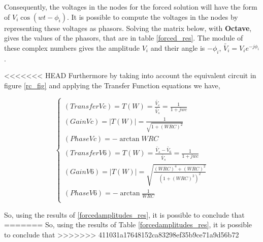 
Consequently, the voltages in the nodes for the forced solution will have the form of $V_i\cos(wt-\phi_i)$. It is possible to compute the voltages in the nodes by representing these voltages as phasors. Solving the matrix below, with {\bf Octave}, gives the values of the phasors, that are in table \ref{forced_res}. The module of these complex numbers gives the amplitude $V_i$ and their angle is $-\phi_i$, $\widetilde{V_i} = V_ie^{-j\phi_i}$.

<<<<<<< HEAD
Furthermore by taking into account the equivalent circuit in figure \ref{rc_fig} and applying the Transfer Function equations we have,

\begin{equation}
  \begin{cases}
    (Transfer Vc) = T(W) = \frac{\widetilde{V_c}}{\widetilde{{V_s}}} = \frac{1}{1 + jwc} \\
    (Gain Vc) = |T(W)| =  \frac{1}{\sqrt{1 + (WRC)^{2}}} \\
    (Phase Vc) = -\arctan{ WRC } \\
    (Transfer V6) =  T(W) = \frac{\widetilde{V_s} - \widetilde{V_6}}{\widetilde{V_s}} = \frac{1}{1 + jwc} \\
    (Gain V6) = |T(W)| =  \sqrt{\frac{(WRC)^4 + (WRC)^2}{(1 + (WRC)^2)^2 }}   \\
    (Phase V6) = -\arctan{ \frac{1}{WRC } } \\
  \end{cases}
\end{equation}

So, using the results of \ref{forcedamplitudes_res}, it is possible to conclude that
=======
So, using the results of Table \ref{forcedamplitudes_res}, it is possible to conclude that
>>>>>>> 411031a17648152ca83298ef35b9ce71a9d56b72

\begin{equation}
  
\end{equation}


